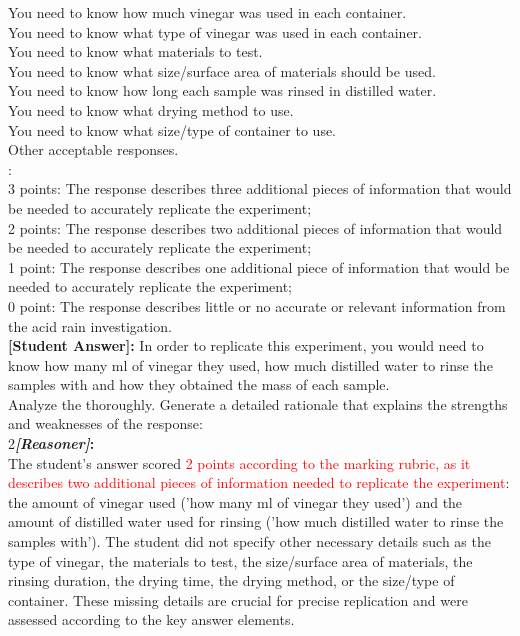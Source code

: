 \begin{figure*}
\begin{tcolorbox}[
    colback=gray!10,      %
    colframe=gray!80,     %
    title=Case Study 3,
    fonttitle=\bfseries,  %
    rounded corners,
    boxrule=0.5mm,        %
    width=\linewidth
]
You need to know how much vinegar was used in each container.\\
You need to know what type of vinegar was used in each container.\\
You need to know what materials to test.\\
You need to know what size/surface area of materials should be used.\\
You need to know how long each sample was rinsed in distilled water.\\
You need to know what drying method to use.\\
You need to know what size/type of container to use.\\
Other acceptable responses.\\
:\\
3 points: The response describes three additional pieces of information that would be needed to accurately replicate the experiment;\\
2 points: The response describes two additional pieces of information that would be needed to accurately replicate the experiment;\\
1 point: The response describes one additional piece of information that would be needed to accurately replicate the experiment;\\
0 point: The response describes little or no accurate or relevant information from the acid rain investigation.\\
 \textbf{[Student Answer]:} In order to replicate this experiment, you would need to know how many ml of vinegar they used, how much distilled water to rinse the samples with and how they obtained the mass of each sample.\\
 Analyze the  thoroughly. Generate a detailed rationale that explains the strengths and weaknesses of the response: \\
\textcircled{\raisebox{-0.3pt} {\scriptsize2}}\textbf{\emph{[Reasoner]}:}\\
 The student's answer scored \textcolor{red}{2 points according to the marking rubric, as it describes two additional pieces of information needed to replicate the experiment}: the amount of vinegar used ('how many ml of vinegar they used') and the amount of distilled water used for rinsing ('how much distilled water to rinse the samples with'). The student did not specify other necessary details such as the type of vinegar, the materials to test, the size/surface area of materials, the rinsing duration, the drying time, the drying method, or the size/type of container. These missing details are crucial for precise replication and were assessed according to the key answer elements.\\

\end{tcolorbox}
\end{figure*}

